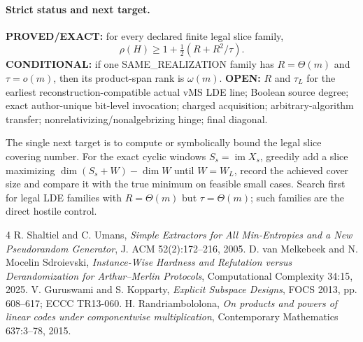 \documentclass[11pt]{article}
\begin{document}
\paragraph{Strict status and next target.}
\textbf{PROVED/EXACT:} for every declared finite legal slice family,
\[
\rho(H)\ge1+\tfrac12(R+R^2/\tau).
\]
\textbf{CONDITIONAL:} if one SAME\_REALIZATION family has $R=\Theta(m)$ and $\tau=o(m)$, then its product-span rank is $\omega(m)$.
\textbf{OPEN:} $R$ and $\tau_L$ for the earliest reconstruction-compatible actual vMS LDE line; Boolean source degree; exact author-unique bit-level invocation; charged acquisition; arbitrary-algorithm transfer; nonrelativizing/nonalgebrizing hinge; final diagonal.

The single next target is to compute or symbolically bound the legal slice covering number. For the exact cyclic windows $S_s=\operatorname{im}X_s$, greedily add a slice maximizing $\dim(S_s+W)-\dim W$ until $W=W_L$, record the achieved cover size and compare it with the true minimum on feasible small cases. Search first for legal LDE families with $R=\Theta(m)$ but $\tau=\Theta(m)$; such families are the direct hostile control.

\begin{thebibliography}{4}
 R. Shaltiel and C. Umans, \emph{Simple Extractors for All Min-Entropies and a New Pseudorandom Generator}, J. ACM 52(2):172--216, 2005.
 D. van Melkebeek and N. Mocelin Sdroievski, \emph{Instance-Wise Hardness and Refutation versus Derandomization for Arthur--Merlin Protocols}, Computational Complexity 34:15, 2025.
 V. Guruswami and S. Kopparty, \emph{Explicit Subspace Designs}, FOCS 2013, pp. 608--617; ECCC TR13-060.
 H. Randriambololona, \emph{On products and powers of linear codes under componentwise multiplication}, Contemporary Mathematics 637:3--78, 2015.
\end{thebibliography}
\end{document}
